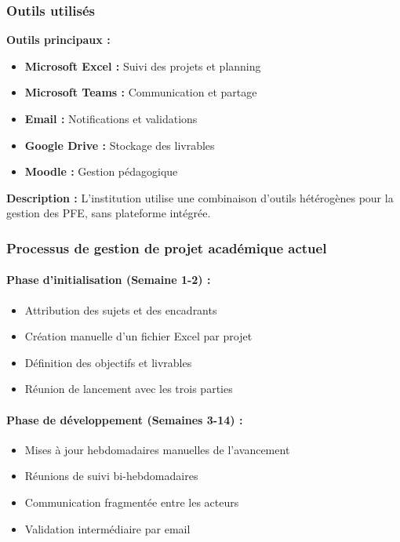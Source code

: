 \subsubsection{Outils utilisés}
\textbf{Outils principaux :}
\begin{itemize}
    \item \textbf{Microsoft Excel :} Suivi des projets et planning
    \item \textbf{Microsoft Teams :} Communication et partage
    \item \textbf{Email :} Notifications et validations
    \item \textbf{Google Drive :} Stockage des livrables
    \item \textbf{Moodle :} Gestion pédagogique
\end{itemize}

\textbf{Description :} L'institution utilise une combinaison d'outils hétérogènes pour la gestion des PFE, sans plateforme intégrée.

\subsubsection{Processus de gestion de projet académique actuel}

\paragraph{Phase d'initialisation (Semaine 1-2) :}
\begin{itemize}
    \item Attribution des sujets et des encadrants
    \item Création manuelle d'un fichier Excel par projet
    \item Définition des objectifs et livrables
    \item Réunion de lancement avec les trois parties
\end{itemize}

\paragraph{Phase de développement (Semaines 3-14) :}
\begin{itemize}
    \item Mises à jour hebdomadaires manuelles de l'avancement
    \item Réunions de suivi bi-hebdomadaires
    \item Communication fragmentée entre les acteurs
    \item Validation intermédiaire par email
\end{itemize}

